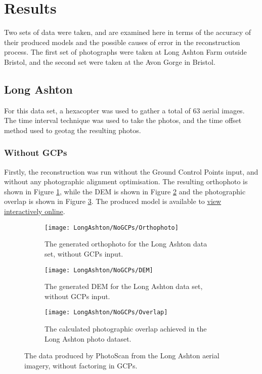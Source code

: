 \section{Results}

Two sets of data were taken, and are examined here in terms of the accuracy of
their produced models and the possible causes of error in the reconstruction
process. The first set of photographs were taken at Long Ashton Farm outside
Bristol, and the second set were taken at the Avon Gorge in Bristol.

\subsection{Long Ashton}

For this data set, a hexacopter was used to gather a total of 63 aerial images.
The time interval technique was used to take the photos, and the time offset
method used to geotag the resulting photos.

\subsubsection{Without GCPs}
\label{sec:results/long-ashton/no-gcp}

Firstly, the reconstruction was run without the Ground Control Points input, and
without any photographic alignment optimisation. The resulting orthophoto is
shown in Figure \ref{img:long-ashton/no-gcps/orthophoto}, while the DEM is shown
in Figure \ref{img:long-ashton/no-gcps/dem} and the photographic overlap is shown
in Figure \ref{img:long-ashton/no-gcps/overlap}. The produced model is available
to \href{https://sketchfab.com/models/ad8a1d9f8c324eb592a9e4beabc5a51e}{view
interactively online}.

\begin{figure}
    \centering
    \begin{subfigure}[b]{0.3\textwidth}
        \texttt{[image: LongAshton/NoGCPs/Orthophoto]}
        \caption{The generated orthophoto for the Long Ashton data set, without
        GCPs input.}
        \label{img:long-ashton/no-gcps/orthophoto}
    \end{subfigure}
    \begin{subfigure}[b]{0.3\textwidth}
        \texttt{[image: LongAshton/NoGCPs/DEM]}
        \caption{The generated DEM for the Long Ashton data set, without GCPs
        input.}
        \label{img:long-ashton/no-gcps/dem}
    \end{subfigure}
    \begin{subfigure}[b]{0.3\textwidth}
        \texttt{[image: LongAshton/NoGCPs/Overlap]}
        \caption{The calculated photographic overlap achieved in the Long Ashton
        photo dataset.}
        \label{img:long-ashton/no-gcps/overlap}
    \end{subfigure}
    \caption{The data produced by PhotoScan from the Long Ashton aerial imagery,
    without factoring in GCPs.}
    \label{img:long-ashton/no-gcps}
\end{figure}

